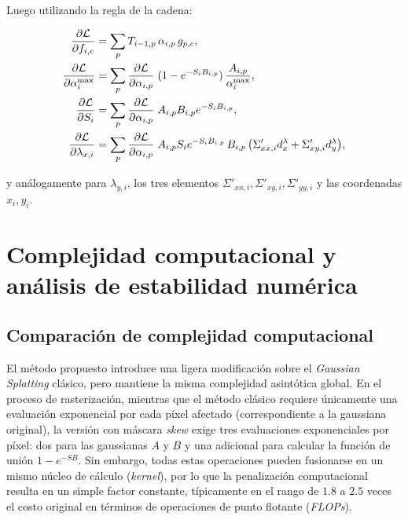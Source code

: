 Luego utilizando la regla de la cadena:

\begin{align}
\frac{\partial\mathcal{L}}{\partial f_{i,c}}
  &= \sum_{p}T_{i-1,p}\,\alpha_{i,p}\,g_{p,c},
\\
\frac{\partial\mathcal{L}}{\partial \alpha_i^{\max}}
  &=\sum_{p}
     \frac{\partial\mathcal{L}}{\partial\alpha_{i,p}}\;
     (1-e^{-S_i B_{i,p}})\,
     \frac{A_{i,p}}{\alpha_i^{\max}},
\\
\frac{\partial\mathcal{L}}{\partial S_i}
  &=\sum_{p}
     \frac{\partial\mathcal{L}}{\partial\alpha_{i,p}}\;
     A_{i,p} B_{i,p} e^{-S_i B_{i,p}},
\\
\frac{\partial\mathcal{L}}{\partial \lambda_{x,i}}
  &=\sum_{p}
     \frac{\partial\mathcal{L}}{\partial\alpha_{i,p}}\;
     A_{i,p}S_i e^{-S_i B_{i,p}}\,B_{i,p}\,
     \bigl(\Sigma'_{xx,i}d_x^{\lambda}+\Sigma'_{xy,i}d_y^{\lambda}\bigr),
\end{align}

y análogamente para \(\lambda_{y,i}\),
los tres elementos \(\Sigma'_{xx,i},\Sigma'_{xy,i},\Sigma'_{yy,i}\)
y las coordenadas \(x_i,y_i\).



\section{Complejidad computacional y análisis de estabilidad numérica}

\subsection{Comparación de complejidad computacional}

El método propuesto introduce una ligera modificación sobre el \textit{Gaussian Splatting} clásico, pero mantiene la misma complejidad asintótica global. En el proceso de rasterización, mientras que el método clásico requiere únicamente una evaluación exponencial por cada píxel afectado (correspondiente a la gaussiana original), la versión con máscara \textit{skew} exige tres evaluaciones exponenciales por píxel: dos para las gaussianas $A$ y $B$ y una adicional para calcular la función de unión $1 - e^{-SB}$. Sin embargo, todas estas operaciones pueden fusionarse en un mismo núcleo de cálculo (\textit{kernel}), por lo que la penalización computacional resulta en un simple factor constante, típicamente en el rango de $1.8$ a $2.5$ veces el costo original en términos de operaciones de punto flotante (\textit{FLOPs}).

